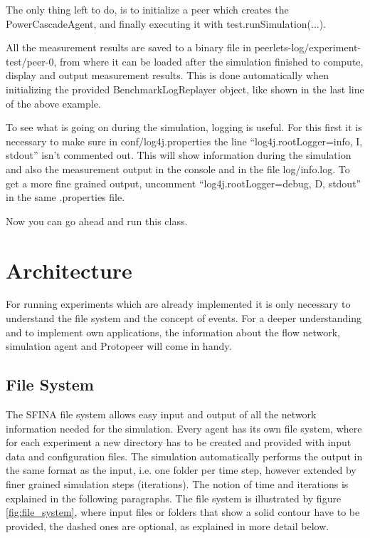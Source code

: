 \documentclass[11pt,fleqn]{book} %
\begin{document}
The only thing left to do, is to initialize a peer which creates the PowerCascadeAgent, and finally executing it with test.runSimulation(...).

All the measurement results are saved to a binary file in peerlets-log/experiment-test/peer-0, from where it can be loaded after the simulation finished to compute, display and output measurement results. This is done automatically when initializing the provided BenchmarkLogReplayer object, like shown in the last line of the above example. 

To see what is going on during the simulation, logging is useful. For this first it is necessary to make sure in conf/log4j.properties the line “log4j.rootLogger=info, I, stdout” isn’t commented out. This will show information during the simulation and also the measurement output in the console and in the file log/info.log. To get a more fine grained output, uncomment “log4j.rootLogger=debug, D, stdout” in the same .properties file.

Now you can go ahead and run this class.



\chapter{Architecture}

For running experiments which are already implemented it is only necessary to understand the file system and the concept of events. For a deeper understanding and to implement own applications, the information about the flow network, simulation agent and Protopeer will come in handy. 


\section{File System}\label{sec:file_system}
The SFINA file system allows easy input and output of all the network information needed for the simulation. Every agent has its own file system, where for each experiment a new directory has to be created and provided with input data and configuration files. The simulation automatically performs the output in the same format as the input, i.e. one folder per time step, however extended by finer grained simulation steps (iterations). The notion of time and iterations is explained in the following paragraphs. The file system is illustrated by figure \ref{fig:file_system}, where input files or folders that show a solid contour have to be provided, the dashed ones are optional, as explained in more detail below.
\end{document}
